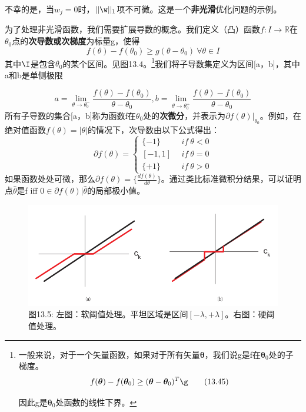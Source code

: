 \documentclass[a4paper]{article}
\begin{document}
不幸的是，当$w_j=0$时，$||\w||_1$项不可微。这是一个\textbf{非光滑}优化问题的示例。

为了处理非光滑函数，我们需要扩展导数的概念。我们定义（凸）函数$f:\mathit{I}\to \mathbb{R}$在$\theta_0$点的\textbf{次导数或次梯度}为标量g，使得
\begin{equation}
	f(\theta)-f(\theta_0)\ge g(\theta-\theta_0)\ \forall\theta \in \mathit{I}\tag{13.44}
\end{equation}
其中$\I$是包含$\theta_0$的某个区间。见图13.4。\footnote{一般来说，对于一个矢量函数，如果对于所有矢量$\boldsymbol{\theta}$，我们说g是f在$\boldsymbol{\theta}_0$处的子梯度。
\begin{equation}
	f(\boldsymbol{\theta})-f(\boldsymbol{\theta}_0)\ge (\boldsymbol{\theta}-\boldsymbol{\theta}_0)^T\g\tag{13.45}
\end{equation}
 
 因此g是$\boldsymbol{\theta}_0$处函数的线性下界。}我们将子导数集定义为区间[a，b]，其中a和b是单侧极限

\begin{equation}
	a=\lim\limits_{\theta\to \theta_0^-} \dfrac{f(\theta)-f(\theta_0)}{\theta-\theta_0},b=\lim\limits_{\theta\to \theta_0^+} \dfrac{f(\theta)-f(\theta_0)}{\theta-\theta_0}\tag{13.46}
\end{equation}
所有子导数的集合[a，b]称为函数f在$\theta_0$处的\textbf{次微分}，并表示为$\partial
f(\theta)|_{\theta_0}$。例如，在绝对值函数$f(\theta)=|\theta|$的情况下，次导数由以下公式得出：
\begin{equation}
	\partial f(\theta)=
	\left\{
	\begin{array}{rl}
	\{-1\}& \ \ if\ \theta<0\\
	\left[-1,1\right]&\ \ if\ \theta = 0 \\
	\{+1\}&\ \ if\ \theta>0\tag{13.47}
	\end{array} \right.
\end{equation}
如果函数处处可微，那么$\partial f(\theta )=\{\frac{df(\theta)}{d\theta}\}$。通过类比标准微积分结果，可以证明点$\hat{\theta}$是f iff 0$\in \partial f(\theta)|\hat{\theta}$的局部极小值。
\begin{figure}[h]
	\centering
	\includegraphics[width=0.7\linewidth]{fig13/figure5}
	\caption*{图13.5: 左图：软阈值处理。平坦区域是区间$[-\lambda, +\lambda]$。右图：硬阈值处理。}
\end{figure}
\end{document}
